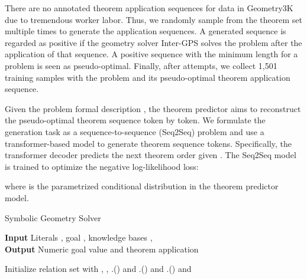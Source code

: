 \documentclass[11pt,a4paper]{article}
\begin{document}
There are no annotated theorem application sequences for data in Geometry3K due to tremendous worker labor. 
Thus, we randomly sample from the theorem set multiple times to generate the application sequences.
A generated sequence is regarded as positive if the geometry solver Inter-GPS solves the problem after the application of that sequence. A positive sequence with the minimum length for a problem is seen as pseudo-optimal. Finally, after attempts, we collect 1,501 training samples with the problem and its pseudo-optimal theorem application sequence. 

Given the problem formal description , the theorem predictor aims to reconstruct the pseudo-optimal theorem  sequence  token by token. We formulate the generation task as a sequence-to-sequence (Seq2Seq) problem and use a transformer-based model \cite{lewis2020bart} to generate theorem sequence tokens.  Specifically, the transformer decoder predicts the next theorem order  given . The Seq2Seq model is trained to optimize the negative log-likelihood loss:

where  is the parametrized conditional  distribution in the theorem predictor model.

\begin{algorithm}[t]
\caption{Symbolic Geometry Solver}
\label{alg:solver}
\small
\hspace*{0.02in} {\bf Input} 
 Literals , goal , knowledge bases \hspace*{0.0in}  ,  \\
\hspace*{0.02in} {\bf Output}
Numeric goal value  and theorem application 
\begin{algorithmic}[1]
        \State Initialize relation set  with , , 
        \State  {}
        \For{} 
            \State 
            \State .()
        \EndFor
        \State 
        \If {}
            \State \Return  and 
        \EndIf
        \For{} 
            \State 
            \State .()
            \State 
            \If {}
                \State \Return  and 
            \EndIf
        \EndFor
        \For{} 
            \State 
            \State .()
            \State 
            \If {}
                \State \Return  and 
            \EndIf
        \EndFor
        \EndWhile\label{euclidendwhile}
\EndFunction
\end{algorithmic}
\end{algorithm}
\end{document}
